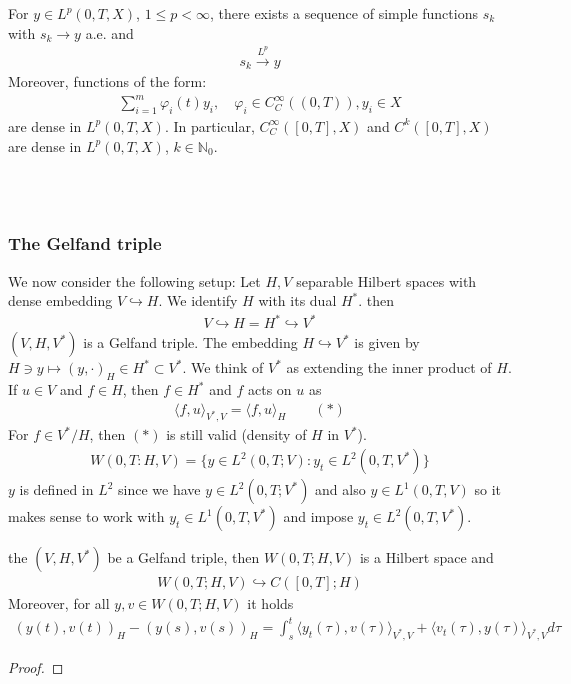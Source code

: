 \begin{lemma}
	For $y \in L^p(0, T, X)$, $1 \le p < \infty$, there exists a sequence of simple functions $s_k$ with $s_k \rightarrow y$ a.e. and 
	\begin{align*}
		s_k \overset{L^p}{\rightarrow} y
	\end{align*}
	Moreover, functions of the form:
	\begin{align*}
		\sum_{i = 1}^m \varphi_i(t)y_i, \quad \varphi_i \in C_C^\infty((0, T)), y_i \in X
	\end{align*}
	are dense in $L^p(0, T, X)$. In particular, $C_C^\infty([0, T], X)$ and $C^k([0, T], X)$ are dense in $L^p(0, T, X)$, $k \in \mathbb{N}_0$. 
\end{lemma}
\quad\\
\quad\\
\subsubsection{The Gelfand triple}
We now consider the following setup: Let $H, V$ separable Hilbert spaces with dense embedding $V \hookrightarrow H$. We identify $H$ with its dual $H^*$. then
\begin{align*}
	V \hookrightarrow H = H^* \hookrightarrow V^*
\end{align*}
$(V, H, V^*)$ is a Gelfand triple. The embedding $H \hookrightarrow V^*$ is given by $H \ni y \mapsto (y, \cdot)_H \in H^* \subset V^*$. We think of $V^*$ as extending the inner product of $H$. If $u \in V$ and $f \in H$, then $f \in H^*$ and $f$ acts on $u$ as 
\begin{align*}
	\langle f, u \rangle_{V^*, V} = \langle f, u \rangle_H \qquad(*)
\end{align*}
For $f \in V^* \slash H$, then $(*)$ is still valid (density of $H$ in $V^*$).
\begin{align*}
	W(0, T: H, V) = \{ y \in L^2(0, T; V): y_t \in L^2(0, T, V^*)\}
\end{align*}
$y$ is defined in $L^2$ since we have $y \in L^2(0, T; V^*)$ and also $y \in L^1(0, T, V)$ so it makes sense to work with $y_t \in L^1(0, T, V^*)$ and impose $y_t \in L^2(0, T, V^*)$. 

\begin{theorem}
	the $(V, H, V^*)$ be a Gelfand triple, then $W(0, T; H, V)$ is a Hilbert space and 
	\begin{align*}
		W(0, T; H, V) \hookrightarrow C([0, T]; H)
	\end{align*}
	Moreover, for all $y, v \in W(0, T; H, V)$ it holds
	\begin{align*}
		(y(t), v(t))_H - (y(s), v(s))_H 
		= \int_s^t \langle y_t(\tau), v(\tau) \rangle_{V^*, V} + \langle v_t(\tau), y(\tau)\rangle_{V^*, V} d\tau
	\end{align*}
\end{theorem}
\begin{proof}
\end{proof}

